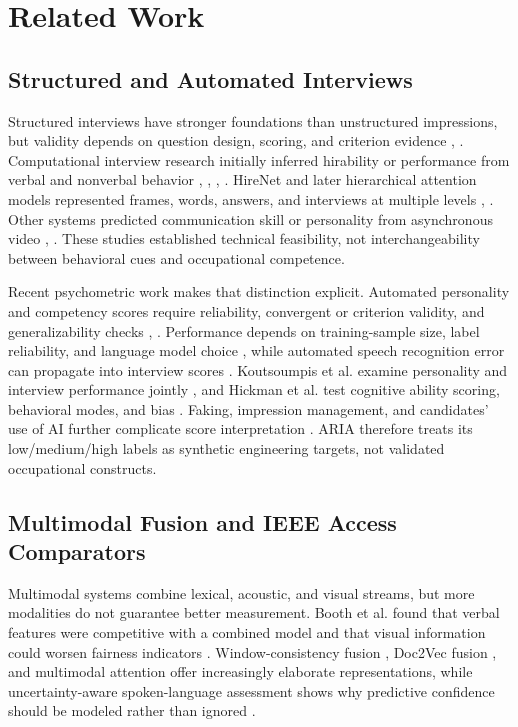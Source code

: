 \documentclass[journal]{IEEEtran}
\begin{document}
\section{Related Work}

\subsection{Structured and Automated Interviews}

Structured interviews have stronger foundations than unstructured impressions, but validity depends on question design, scoring, and criterion evidence \cite{levashina2014structured}, \cite{mcdaniel1994validity}. Computational interview research initially inferred hirability or performance from verbal and nonverbal behavior \cite{naim2018automated}, \cite{nguyen2014hireme}, \cite{chen2016monologue}, \cite{chen2016doc2vec}. HireNet and later hierarchical attention models represented frames, words, answers, and interviews at multiple levels \cite{hemamou2019hirenet}, \cite{hemamou2023multimodal}. Other systems predicted communication skill or personality from asynchronous video \cite{suen2020agent}, \cite{suen2019personality}. These studies established technical feasibility, not interchangeability between behavioral cues and occupational competence.


Recent psychometric work makes that distinction explicit. Automated personality and competency scores require reliability, convergent or criterion validity, and generalizability checks \cite{hickman2022personality}, \cite{liff2024psychometric}. Performance depends on training-sample size, label reliability, and language model choice \cite{hickman2024training}, while automated speech recognition error can propagate into interview scores \cite{hickman2025asr}. Koutsoumpis et al. examine personality and interview performance jointly \cite{koutsoumpis2024psychometric}, and Hickman et al. test cognitive ability scoring, behavioral modes, and bias \cite{hickman2025smart}. Faking, impression management, and candidates' use of AI further complicate score interpretation \cite{hickman2025faking}. ARIA therefore treats its low/medium/high labels as synthetic engineering targets, not validated occupational constructs.


\subsection{Multimodal Fusion and IEEE Access Comparators}

Multimodal systems combine lexical, acoustic, and visual streams, but more modalities do not guarantee better measurement. Booth et al. found that verbal features were competitive with a combined model and that visual information could worsen fairness indicators \cite{booth2021bias}. Window-consistency fusion \cite{lv2024window}, Doc2Vec fusion \cite{chen2016doc2vec}, and multimodal attention \cite{hemamou2023multimodal} offer increasingly elaborate representations, while uncertainty-aware spoken-language assessment shows why predictive confidence should be modeled rather than ignored \cite{malinin2017uncertainty}.
\end{document}
